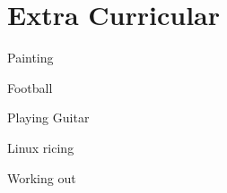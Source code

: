 \documentclass[]{deedy-resume-openfont}
\begin{document}
\begin{minipage}[t]{0.33\textwidth}
\begin{tightemize}
\item {}

\item {}

\end{tightemize}
\sectionsep

\section{Extra Curricular}
\sectionsep
\begin{tightemize}
\item Painting
\item Football
\item Playing Guitar
\item Linux ricing
\item Working out
\end{tightemize}
\sectionsep

\end{minipage} 
\end{document}
